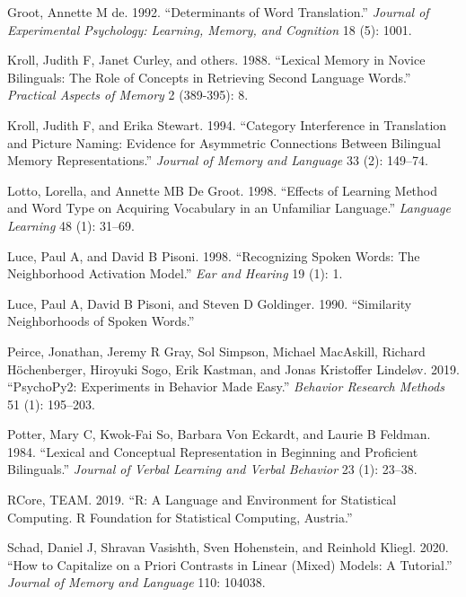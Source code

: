 \documentclass[
  man]{apa6}
\newlength{\cslhangindent}
\newenvironment{CSLReferences}[2] %
 {%
  \setlength{\parindent}{0pt}
  \ifodd #1 \everypar{\setlength{\hangindent}{\cslhangindent}}\ignorespaces\fi
  \ifnum #2 > 0
  \setlength{\parskip}{#2\baselineskip}
  \fi
 }%
 {}
\begin{document}
\begin{CSLReferences}{1}{0}
\leavevmode{}%
Groot, Annette M de. 1992. {``Determinants of Word Translation.''}
\emph{Journal of Experimental Psychology: Learning, Memory, and
Cognition} 18 (5): 1001.

\leavevmode{}%
Kroll, Judith F, Janet Curley, and others. 1988. {``Lexical Memory in
Novice Bilinguals: The Role of Concepts in Retrieving Second Language
Words.''} \emph{Practical Aspects of Memory} 2 (389-395): 8.

\leavevmode{}%
Kroll, Judith F, and Erika Stewart. 1994. {``Category Interference in
Translation and Picture Naming: Evidence for Asymmetric Connections
Between Bilingual Memory Representations.''} \emph{Journal of Memory and
Language} 33 (2): 149--74.

\leavevmode{}%
Lotto, Lorella, and Annette MB De Groot. 1998. {``Effects of Learning
Method and Word Type on Acquiring Vocabulary in an Unfamiliar
Language.''} \emph{Language Learning} 48 (1): 31--69.

\leavevmode{}%
Luce, Paul A, and David B Pisoni. 1998. {``Recognizing Spoken Words: The
Neighborhood Activation Model.''} \emph{Ear and Hearing} 19 (1): 1.

\leavevmode{}%
Luce, Paul A, David B Pisoni, and Steven D Goldinger. 1990.
{``Similarity Neighborhoods of Spoken Words.''}

\leavevmode{}%
Peirce, Jonathan, Jeremy R Gray, Sol Simpson, Michael MacAskill, Richard
Höchenberger, Hiroyuki Sogo, Erik Kastman, and Jonas Kristoffer
Lindeløv. 2019. {``PsychoPy2: Experiments in Behavior Made Easy.''}
\emph{Behavior Research Methods} 51 (1): 195--203.

\leavevmode{}%
Potter, Mary C, Kwok-Fai So, Barbara Von Eckardt, and Laurie B Feldman.
1984. {``Lexical and Conceptual Representation in Beginning and
Proficient Bilinguals.''} \emph{Journal of Verbal Learning and Verbal
Behavior} 23 (1): 23--38.

\leavevmode{}%
RCore, TEAM. 2019. {``R: A Language and Environment for Statistical
Computing. R Foundation for Statistical Computing, Austria.''}

\leavevmode{}%
Schad, Daniel J, Shravan Vasishth, Sven Hohenstein, and Reinhold Kliegl.
2020. {``How to Capitalize on a Priori Contrasts in Linear (Mixed)
Models: A Tutorial.''} \emph{Journal of Memory and Language} 110:
104038.


\end{CSLReferences}
\end{document}
